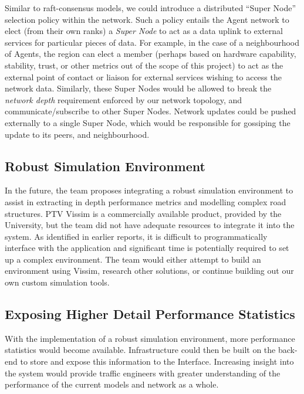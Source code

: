 \documentclass{report}
\begin{document}
Similar to raft-consensus models, we could introduce a distributed ``Super Node'' selection policy within the network.
Such a policy entails the Agent network to elect (from their own ranks) a \emph{Super Node} to act as a data uplink to external services for particular pieces of data.
For example, in the case of a neighbourhood of Agents, the region can elect a member (perhaps based on hardware capability, stability, trust, or other metrics out of the scope of this project) to act as the external point of contact or liaison for external services wishing to access the network data.
Similarly, these Super Nodes would be allowed to break the \emph{network depth} requirement enforced by our network topology, and communicate/subscribe to other Super Nodes.
Network updates could be pushed externally to a single Super Node, which would be responsible for gossiping the update to its peers, and neighbourhood.\\

\subsection{Robust Simulation Environment}
In the future, the team proposes integrating a robust simulation environment to assist in extracting in depth performance metrics and modelling complex road structures. 
PTV Vissim is a commercially available product, provided by the University, but the team did not have adequate resources to integrate it into the system. 
As identified in earlier reports, it is difficult to programmatically interface with the application and significant time is potentially required to set up a complex environment. 
The team would either attempt to build an environment using Vissim, research other solutions, or continue building out our own custom simulation tools.\\

\subsection{Exposing Higher Detail Performance Statistics}
With the implementation of a robust simulation environment, more performance statistics would become available. 
Infrastructure could then be built on the back-end to store and expose this information to the Interface.
Increasing insight into the system would provide traffic engineers with greater understanding of the performance of the current models and network as a whole.\\
\end{document}
